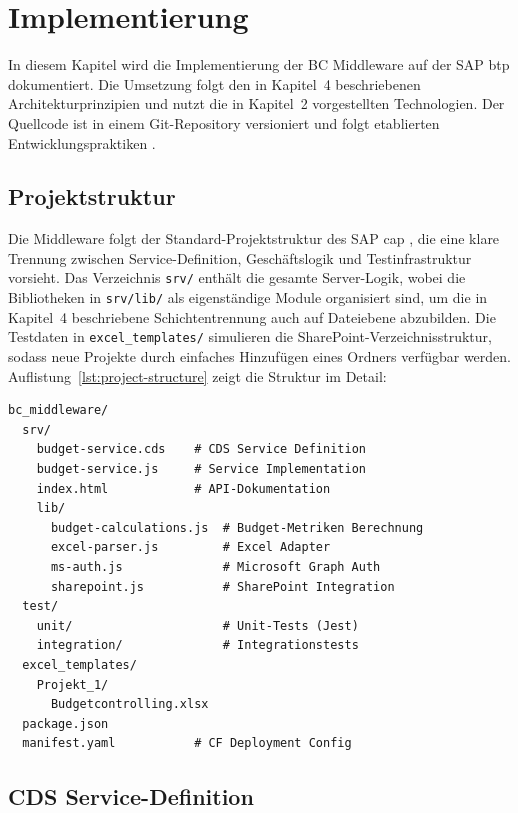 \section{Implementierung}

In diesem Kapitel wird die Implementierung der BC Middleware auf der SAP \gls{btp} dokumentiert. Die Umsetzung folgt den in Kapitel~4 beschriebenen Architekturprinzipien und nutzt die in Kapitel~2 vorgestellten Technologien. Der Quellcode ist in einem Git-Repository versioniert und folgt etablierten Entwicklungspraktiken \citep{sommerville2015}.

\subsection{Projektstruktur}

Die Middleware folgt der Standard-Projektstruktur des SAP \gls{cap} \citep{sap2024cap}, die eine klare Trennung zwischen Service-Definition, Geschäftslogik und Testinfrastruktur vorsieht. Das Verzeichnis \texttt{srv/} enthält die gesamte Server-Logik, wobei die Bibliotheken in \texttt{srv/lib/} als eigenständige Module organisiert sind, um die in Kapitel~4 beschriebene Schichtentrennung auch auf Dateiebene abzubilden. Die Testdaten in \texttt{excel\_templates/} simulieren die SharePoint-Verzeichnisstruktur, sodass neue Projekte durch einfaches Hinzufügen eines Ordners verfügbar werden. Auflistung~\ref{lst:project-structure} zeigt die Struktur im Detail:

\begin{lstlisting}[caption={Projektstruktur}, label={lst:project-structure}]
bc_middleware/
  srv/
    budget-service.cds    # CDS Service Definition
    budget-service.js     # Service Implementation
    index.html            # API-Dokumentation
    lib/
      budget-calculations.js  # Budget-Metriken Berechnung
      excel-parser.js         # Excel Adapter
      ms-auth.js              # Microsoft Graph Auth
      sharepoint.js           # SharePoint Integration
  test/
    unit/                     # Unit-Tests (Jest)
    integration/              # Integrationstests
  excel_templates/
    Projekt_1/
      Budgetcontrolling.xlsx
  package.json
  manifest.yaml           # CF Deployment Config
\end{lstlisting}

\subsection{CDS Service-Definition}

